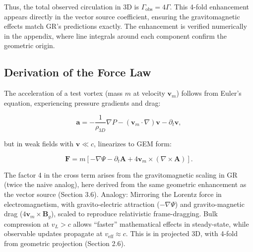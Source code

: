 \documentclass{article}
\begin{document}
Thus, the total observed circulation in 3D is $\Gamma_{\text{obs}} = 4\Gamma$. This 4-fold enhancement appears directly in the vector source coefficient, ensuring the gravitomagnetic effects match GR's predictions exactly. The enhancement is verified numerically in the appendix, where line integrals around each component confirm the geometric origin.

\subsection{Derivation of the Force Law}

The acceleration of a test vortex (mass $m$ at velocity $\mathbf{v}_m$) follows from Euler's equation, experiencing pressure gradients and drag:

\[
\mathbf{a} = -\frac{1}{\rho_{3D}} \nabla P - (\mathbf{v}_m \cdot \nabla) \mathbf{v} - \partial_t \mathbf{v},
\]

but in weak fields with $\mathbf{v} \ll c$, linearizes to GEM form:

\[
\mathbf{F} = m \left[ -\nabla \Psi - \partial_t \mathbf{A} + 4 \mathbf{v}_m \times (\nabla \times \mathbf{A}) \right].
\]

The factor 4 in the cross term arises from the gravitomagnetic scaling in GR (twice the naive analog), here derived from the same geometric enhancement as the vector source (Section 3.6). Analogy: Mirroring the Lorentz force in electromagnetism, with gravito-electric attraction ($-\nabla \Psi$) and gravito-magnetic drag ($4 \mathbf{v}_m \times \mathbf{B}_g$), scaled to reproduce relativistic frame-dragging. Bulk compression at $v_L > c$ allows ``faster'' mathematical effects in steady-state, while observable updates propagate at $v_{\text{eff}} \approx c$. This is in projected 3D, with 4-fold from geometric projection (Section 2.6).
\end{document}
